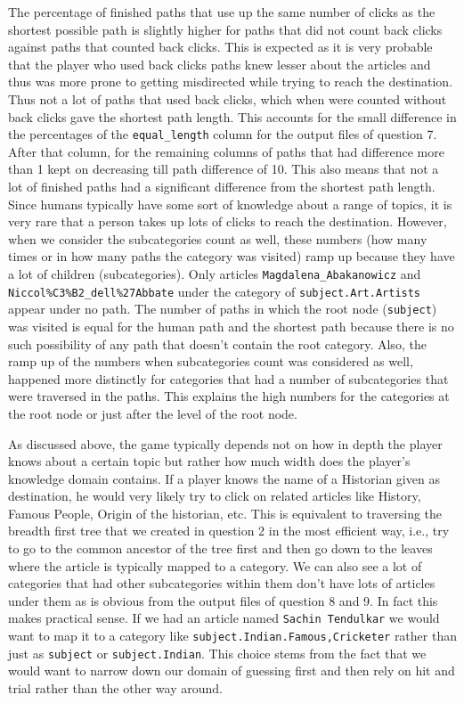\documentclass[letterpaper,12pt]{article}
\begin{document}
The percentage of finished paths that use up the same number of clicks as the shortest possible path is slightly higher for paths that did not count back clicks against paths that counted back clicks. This is expected as it is very probable that the player who used back clicks paths knew lesser about the articles and thus was more prone to getting misdirected while trying to reach the destination. Thus not a lot of paths that used back clicks, which when were counted without back clicks gave the shortest path length. This accounts for the small difference in the percentages of the \verb|equal_length| column for the output files of question 7. After that column, for the remaining columns of paths that had difference more than 1 kept on decreasing till path difference of 10. This also means that not a lot of finished paths had a significant difference from the shortest path length. Since humans typically have some sort of knowledge about a range of topics, it is very rare that a person takes up lots of clicks to reach the destination. However, when we consider the subcategories count as well, these numbers (how many times or in how many paths the category was visited) ramp up because they have a lot of children (subcategories). Only articles \verb|Magdalena_Abakanowicz| and \verb|Niccol%C3%B2_dell%27Abbate| under the category of \verb|subject.Art.Artists| appear under no path. The number of paths in which the root node (\verb|subject|) was visited is equal for the human path and the shortest path because there is no such possibility of any path that doesn't contain the root category. Also, the ramp up of the numbers when subcategories count was considered as well, happened more distinctly for categories that had a number of subcategories that were traversed in the paths. This explains the high numbers for the categories at the root node or just after the level of the root node. 

\bigskip

As discussed above, the game typically depends not on how in depth the player knows about a certain topic but rather how much width does the player's knowledge domain contains. If a player knows the name of a Historian given as destination, he would very likely try to click on related articles like History, Famous People, Origin of the historian, etc. This is equivalent to traversing the breadth first tree that we created in question 2 in the most efficient way, i.e., try to go to the common ancestor of the tree first and then go down to the leaves where the article is typically mapped to a category. We can also see a lot of categories that had other subcategories within them don't have lots of articles under them as is obvious from the output files of question 8 and 9. In fact this makes practical sense. If we had an article named \verb|Sachin Tendulkar| we would want to map it to a category like \verb|subject.Indian.Famous,Cricketer| rather than just as \verb|subject| or \verb|subject.Indian|. This choice stems from the fact that we would want to narrow down our domain of guessing first and then rely on hit and trial rather than the other way around.
\end{document}
